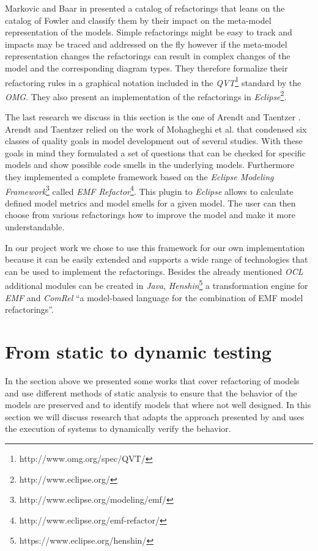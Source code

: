 \documentclass{llncs}
\begin{document}
Markovic and Baar in \cite{DBLP:journals/sosym/MarkovicB08} presented a catalog of refactorings that leans on the catalog of Fowler and classify them by their impact on the meta-model representation of the models. Simple refactorings might be easy to track and impacts may be traced and addressed on the fly however if the meta-model representation changes the refactorings can result in complex changes of the model and the corresponding diagram types. They therefore formalize their refactoring rules in a graphical notation included in the \textit{QVT}\footnote{http://www.omg.org/spec/QVT/} standard by the \textit{OMG}. They also present an implementation of the refactorings in \textit{Eclipse}\footnote{http://www.eclipse.org/}.

The last research we discuss in this section is the one of Arendt and Taentzer \cite{DBLP:conf/models/ArendtTW13}. Arendt and Taentzer relied on the work of Mohagheghi et al. \cite{DBLP:journals/infsof/MohagheghiDN09} that condensed six classes of quality goals in model development out of several studies. With these goals in mind they formulated a set of questions that can be checked for specific models and show possible code smells in the underlying models. Furthermore they implemented a complete framework based on the \textit{Eclipse Modeling Framework}\footnote{http://www.eclipse.org/modeling/emf/} called \textit{EMF Refactor}\footnote{http://www.eclipse.org/emf-refactor/}. This plugin to \textit{Eclipse} allows to calculate defined model metrics and model smells for a given model. The user can then choose from various refactorings how to improve the model and make it more understandable. 

In our project work we chose to use this framework for our own implementation because it can be easily extended and supports a wide range of technologies that can be used to implement the refactorings. Besides the already mentioned \textit{OCL} additional modules can be created in \textit{Java}, \textit{Henshin}\footnote{https://www.eclipse.org/henshin/} a transformation engine for \textit{EMF} and \textit{ComRel} ``a model-based language for the combination of EMF model refactorings''.

\section{From static to dynamic testing}
\label{sec:todynamics}

In the section above we presented some works that cover refactoring of models and use different methods of static analysis to ensure that the behavior of the models are preserved and to identify models that where not well designed. In this section we will discuss research that adapts the approach presented by \cite{rob99} and uses the execution of systems to dynamically verify the behavior.

\newpage


\end{document}
